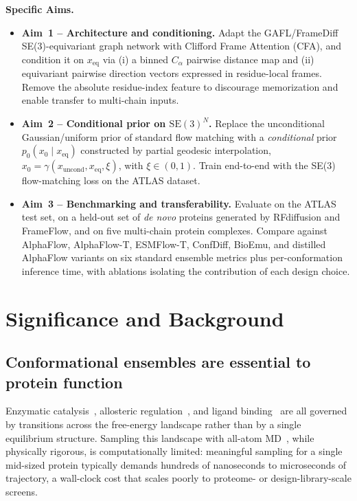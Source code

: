 \documentclass[12pt]{article}
\begin{document}
\noindent\textbf{Specific Aims.}
\begin{itemize}
  \item \textbf{Aim~1 -- Architecture and conditioning.} Adapt the GAFL/FrameDiff
  SE(3)-equivariant graph network with Clifford Frame Attention (CFA), and
  condition it on $x_{\mathrm{eq}}$ via (i) a binned $C_\alpha$ pairwise distance
  map and (ii) equivariant pairwise direction vectors expressed in residue-local
  frames. Remove the absolute residue-index feature to discourage memorization
  and enable transfer to multi-chain inputs.
  \item \textbf{Aim~2 -- Conditional prior on $\mathrm{SE}(3)^N$.} Replace the
  unconditional Gaussian/uniform prior of standard flow matching with a
  \emph{conditional} prior $p_0(x_0 \mid x_{\mathrm{eq}})$ constructed by partial
  geodesic interpolation, $x_0 = \gamma(x_{\mathrm{uncond}}, x_{\mathrm{eq}}, \xi)$,
  with $\xi \in (0,1)$. Train end-to-end with the SE(3) flow-matching loss on the
  ATLAS dataset.
  \item \textbf{Aim~3 -- Benchmarking and transferability.} Evaluate on the
  ATLAS test set, on a held-out set of \emph{de novo} proteins generated by
  RFdiffusion and FrameFlow, and on five multi-chain protein complexes. Compare
  against AlphaFlow, AlphaFlow-T, ESMFlow-T, ConfDiff, BioEmu, and distilled
  AlphaFlow variants on six standard ensemble metrics plus per-conformation
  inference time, with ablations isolating the contribution of each design
  choice.
\end{itemize}

\section{Significance and Background}

\subsection{Conformational ensembles are essential to protein function}
Enzymatic catalysis~\cite{benkovic2008}, allosteric regulation~\cite{bernetti2024},
and ligand binding~\cite{karplus2005} are all governed by transitions across the
free-energy landscape rather than by a single equilibrium structure. Sampling
this landscape with all-atom MD~\cite{abraham2015gromacs,adcock2006md}, while
physically rigorous, is computationally limited: meaningful sampling for a
single mid-sized protein typically demands hundreds of nanoseconds to
microseconds of trajectory, a wall-clock cost that scales poorly to proteome-
or design-library-scale screens.
\end{document}
